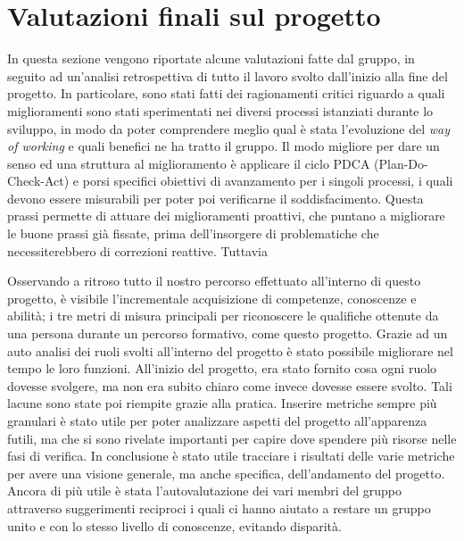 
\section{Valutazioni finali sul progetto}
	In questa sezione vengono riportate alcune valutazioni fatte dal gruppo, in seguito ad un'analisi retrospettiva di tutto il lavoro svolto dall'inizio alla fine del progetto. In particolare, sono stati fatti dei ragionamenti critici riguardo a quali miglioramenti sono stati sperimentati nei diversi processi istanziati durante lo sviluppo, in modo da poter comprendere meglio qual è stata l'evoluzione del \textit{way of working} e quali benefici ne ha tratto il gruppo.
	\newline\newline
	Il modo migliore per dare un senso ed una struttura al miglioramento è applicare il ciclo PDCA (Plan-Do-Check-Act) e porsi specifici obiettivi di avanzamento per i singoli processi, i quali devono essere misurabili per poter poi verificarne il soddisfacimento. Questa prassi permette di attuare dei miglioramenti proattivi, che puntano a migliorare le buone prassi già fissate, prima dell'insorgere di problematiche che necessiterebbero di correzioni reattive.
	Tuttavia
	
	Osservando a ritroso tutto il nostro percorso effettuato all’interno di questo progetto, è visibile l’incrementale acquisizione di competenze, conoscenze e abilità; i tre metri di misura principali per riconoscere le qualifiche ottenute da una persona durante un percorso formativo, come questo progetto.
	\newline
	Grazie ad un auto analisi dei ruoli svolti all’interno del progetto è stato possibile migliorare nel tempo le loro funzioni. All’inizio del progetto, era stato fornito cosa ogni ruolo dovesse svolgere, ma non era subito chiaro come invece dovesse essere svolto. Tali lacune sono state poi riempite grazie alla pratica.
	\newline
	Inserire metriche sempre più granulari è stato utile per poter analizzare aspetti del progetto all’apparenza futili, ma che si sono rivelate importanti per capire dove spendere più risorse nelle fasi di verifica.
	\newline
	In conclusione è stato utile tracciare i risultati delle varie metriche per avere una visione generale, ma anche specifica, dell’andamento del progetto. Ancora di più utile è stata l’autovalutazione dei vari membri del gruppo attraverso suggerimenti reciproci i quali ci hanno aiutato a restare un gruppo unito e con lo stesso livello di conoscenze, evitando disparità.
